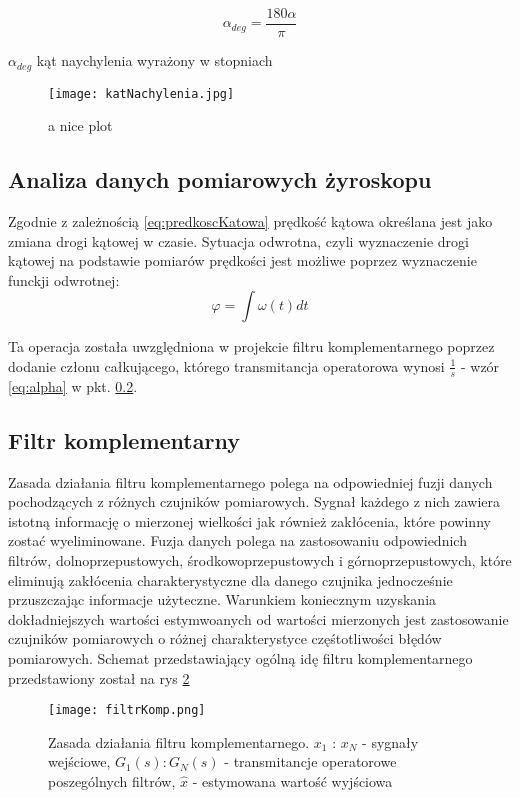 \begin{equation}
    \alpha_{deg}=\frac{180\alpha}{\pi}
    \label{eq:rowniaStopnie}
\end{equation}
\begin{eqwhere}[2cm]
	\item[$\alpha_{deg}$] kąt naychylenia wyrażony w stopniach
\end{eqwhere}
\begin{figure}[h]
    \centering
    \texttt{[image: katNachylenia.jpg]}
    \caption{a nice plot}
    \label{fig:rownia}
\end{figure}
\subsection{Analiza danych pomiarowych żyroskopu}
\label{gyro}
Zgodnie z zależnością \ref{eq:predkoscKatowa} prędkość kątowa określana jest jako zmiana drogi kątowej w czasie. Sytuacja odwrotna, czyli wyznaczenie drogi kątowej na podstawie pomiarów prędkości jest możliwe poprzez wyznaczenie funckji odwrotnej:
\begin{equation}  
    \varphi = \int\omega(t)dt
\end{equation}

Ta operacja została uwzględniona w projekcie filtru komplementarnego poprzez dodanie członu całkującego, którego transmitancja operatorowa wynosi $\frac{1}{s}$ - wzór \ref{eq:alpha} w pkt. \ref{kompZasadaDzialania}.

\subsection{Filtr komplementarny}
\label{kompZasadaDzialania}
Zasada działania filtru komplementarnego polega na odpowiedniej fuzji danych pochodzących z różnych czujników pomiarowych. Sygnał każdego z nich zawiera istotną informację o mierzonej wielkości jak również zakłócenia, które powinny zostać wyeliminowane. Fuzja danych polega na zastosowaniu odpowiednich filtrów, dolnoprzepustowych, środkowoprzepustowych i górnoprzepustowych, które eliminują zakłócenia charakterystyczne dla danego czujnika jednocześnie przuszczając informacje użyteczne. Warunkiem koniecznym uzyskania dokładniejszych wartości estymwoanych od wartości mierzonych jest zastosowanie czujników pomiarowych o różnej charakterystyce częśtotliwości błędów pomiarowych. Schemat przedstawiający ogólną idę filtru komplementarnego przedstawiony został na rys \ref{fig:kompGeneral}
\begin{figure}[h]
    \centering
    \texttt{[image: filtrKomp.png]}
    \caption{Zasada działania filtru komplementarnego. $x_1$ : $x_N$ - sygnały wejściowe, $G_1(s) : G_N(s)$ - transmitancje operatorowe poszególnych filtrów, $\hat{x}$ - estymowana wartość wyjściowa }
    \label{fig:kompGeneral}
\end{figure}

